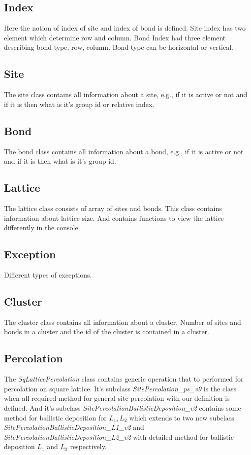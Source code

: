 	
	\subsection{Index}
	Here the notion of index of site and index of bond is defined. Site index has two element which determine row and column. Bond Index had three element describing bond type, row, column. Bond type can be horizontal or vertical.
		
	
	\subsection{Site}
	The site class contains all information about a site, e.g., if it is active or not and if it is then what is it's group id or relative index.
	
	
	\subsection{Bond}
	The bond class contains all information about a bond, e.g., if it is active or not and if it is then what is it's group id.
	
			
	\subsection{Lattice}
	The lattice class consists of array of sites and bonds. This class contains information about lattice size. And contains functions to view the lattice differently in the console.
	
	
	\subsection{Exception}
	Different types of exceptions.
	
	
	\subsection{Cluster}
	The cluster class contains all information about a cluster. Number of sites and bonds in a cluster and the id of the cluster is contained in a cluster.
	
	
	\subsection{Percolation}
	The \textit{SqLatticePercolation} class contains generic operation that to performed for percolation on square lattice. It's subclass  \textit{SitePercolation\_ps\_v9} is the class when all required method for general site percolation with our definition is defined. 
	And it's subclass \textit{SitePercolationBallisticDeposition\_v2}
	contains some method for ballistic deposition for $L_1,L_2$ which extends to two new subclass \textit{SitePercolationBallisticDeposition\_L1\_v2} and \textit{SitePercolationBallisticDeposition\_L2\_v2} with detailed method for ballistic deposition $L_1$ and $L_2$ respectively.
	
